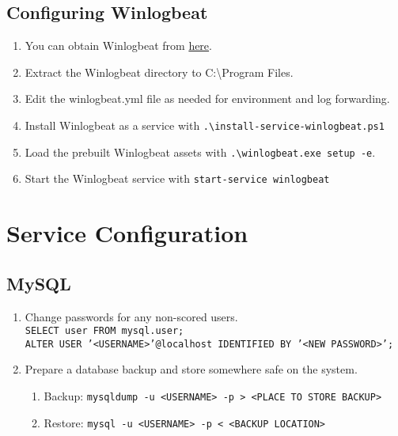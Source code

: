 \documentclass[12pt,letterpaper]{article}
\def\code#1{\textcolor{c2}{\texttt{#1}}}
\begin{document}
\pagebreak

\subsection{Configuring Winlogbeat}

\begin{enumerate}
	\item You can obtain Winlogbeat from \href{https://artifacts.elastic.co/downloads/beats/winlogbeat/winlogbeat-8.12.0-windows-x86_64.zip}{here}.
	\item Extract the Winlogbeat directory to C:\textbackslash{}Program Files.
	\item Edit the winlogbeat.yml file as needed for environment and log forwarding.
	\item Install Winlogbeat as a service with \code{.\textbackslash{}install-service-winlogbeat.ps1}
	\item Load the prebuilt Winlogbeat assets with \code{.\textbackslash{}winlogbeat.exe setup -e}.
	\item Start the Winlogbeat service with \code{start-service winlogbeat}
\end{enumerate}

\pagebreak

\section{Service Configuration}

\subsection{MySQL}

\begin{enumerate}
	\item Change passwords for any non-scored users. \\
		\code{SELECT user FROM mysql.user;} \\
		\code{ALTER USER '<USERNAME>'@localhost IDENTIFIED BY '<NEW PASSWORD>';}
	\item Prepare a database backup and store somewhere safe on the system.
	\begin{enumerate}
		\item Backup: \code{mysqldump -u <USERNAME> -p > <PLACE TO STORE BACKUP>}
		\item Restore: \code{mysql -u <USERNAME> -p < <BACKUP LOCATION>} \\
	\end{enumerate}
\end{enumerate}
\end{document}
